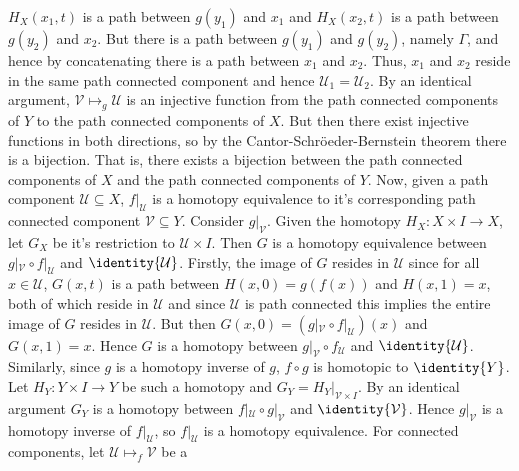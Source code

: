 \documentclass{book}                                                           %
\begin{document}
\begin{solution}
            $H_{X}(x_{1},t)$ is a path between $g(y_{1})$ and $x_{1}$ and
            $H_{X}(x_{2},t)$ is a path between $g(y_{2})$ and $x_{2}$. But there is
            a path between $g(y_{1})$ and $g(y_{2})$, namely $\Gamma$, and hence by
            concatenating there is a path between $x_{1}$ and $x_{2}$. Thus,
            $x_{1}$ and $x_{2}$ reside in the same path connected component and
            hence $\mathcal{U}_{1}=\mathcal{U}_{2}$. By an identical argument,
            $\mathcal{V}\mapsto_{g}\mathcal{U}$ is an injective function from the
            path connected components of $Y$ to the path connected components of
            $X$. But then there exist injective functions in both directions, so by
            the Cantor-Schr\"{o}eder-Bernstein theorem there is a bijection. That
            is, there exists a bijection between the path connected components
            of $X$ and the path connected components of $Y$. Now, given a path
            component $\mathcal{U}\subseteq{X}$, $f|_{\mathcal{U}}$ is a homotopy
            equivalence to it's corresponding path connected component
            $\mathcal{V}\subseteq{Y}$. Consider $g|_{\mathcal{V}}$. Given the
            homotopy $H_{X}:X\times{I}\rightarrow{X}$, let $G_{X}$ be it's
            restriction to $\mathcal{U}\times{I}$. Then $G$ is a homotopy
            equivalence between $g|_{\mathcal{V}}\circ{f}|_{\mathcal{U}}$ and
            $\identity{\mathcal{U}}$. Firstly, the image of $G$ resides in
            $\mathcal{U}$ since for all $x\in\mathcal{U}$, $G(x,t)$ is a path
            between $H(x,0)=g(f(x))$ and $H(x,1)=x$, both of which reside in
            $\mathcal{U}$ and since $\mathcal{U}$ is path connected this implies the
            entire image of $G$ resides in $\mathcal{U}$. But then
            $G(x,0)=(g|_{\mathcal{V}}\circ{f}|_{\mathcal{U}})(x)$ and $G(x,1)=x$.
            Hence $G$ is a homotopy between $g|_{\mathcal{V}}\circ{f}_{\mathcal{U}}$
            and $\identity{\mathcal{U}}$. Similarly, since $g$ is a homotopy inverse
            of $g$, $f\circ{g}$ is homotopic to $\identity{Y}$. Let
            $H_{Y}:Y\times{I}\rightarrow{Y}$ be such a homotopy and
            $G_{Y}=H_{Y}|_{\mathcal{V}\times{I}}$. By an identical argument $G_{Y}$
            is a homotopy between $f|_{\mathcal{U}}\circ{g}|_{\mathcal{V}}$ and
            $\identity{\mathcal{V}}$. Hence $g|_{\mathcal{V}}$ is a homotopy inverse
            of $f|_{\mathcal{U}}$, so $f|_{\mathcal{U}}$ is a homotopy equivalence.
            For connected components, let $\mathcal{U}\mapsto_{f}\mathcal{V}$ be a

\end{solution}
\end{document}
